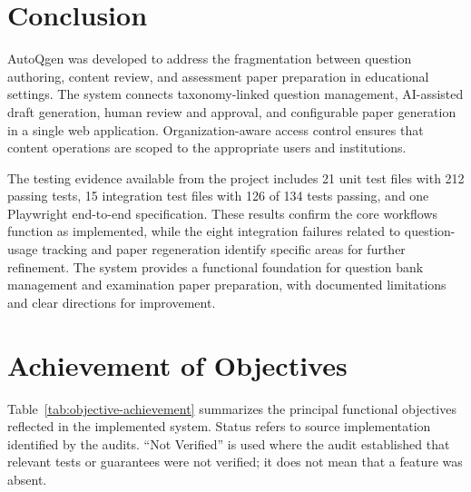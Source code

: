 
\section{Conclusion}

AutoQgen was developed to address the fragmentation between question authoring, content review, and assessment paper preparation in educational settings. The system connects taxonomy-linked question management, AI-assisted draft generation, human review and approval, and configurable paper generation in a single web application. Organization-aware access control ensures that content operations are scoped to the appropriate users and institutions.

The testing evidence available from the project includes 21 unit test files with 212 passing tests, 15 integration test files with 126 of 134 tests passing, and one Playwright end-to-end specification. These results confirm the core workflows function as implemented, while the eight integration failures related to question-usage tracking and paper regeneration identify specific areas for further refinement. The system provides a functional foundation for question bank management and examination paper preparation, with documented limitations and clear directions for improvement.

\section{Achievement of Objectives}

Table~\ref{tab:objective-achievement} summarizes the principal functional objectives reflected in the implemented system. Status refers to source implementation identified by the audits. “Not Verified” is used where the audit established that relevant tests or guarantees were not verified; it does not mean that a feature was absent.

